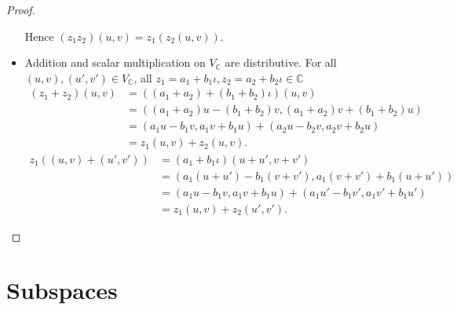 \begin{proof}
\begin{itemize}
              Hence $(z_{1}z_{2})(u, v) = z_{1}(z_{2}(u, v))$.
        \item Addition and scalar multiplication on $V_{\mathbb{C}}$ are distributive. For all $(u, v), (u', v')\in V_{\mathbb{C}}$, all $z_{1} = a_{1} + b_{1}\iota, z_{2} = a_{2} + b_{2}\iota\in \mathbb{C}$
              \begin{align*}
                  (z_{1} + z_{2})(u, v) & = ((a_{1} + a_{2}) + (b_{1} + b_{2})\iota)(u, v)                             \\
                                        & = ((a_{1} + a_{2})u - (b_{1} + b_{2})v, (a_{1} + a_{2})v + (b_{1} + b_{2})u) \\
                                        & = (a_{1}u - b_{1}v, a_{1}v + b_{1}u) + (a_{2}u - b_{2}v, a_{2}v + b_{2}u)    \\
                                        & = z_{1}(u, v) + z_{2}(u, v).
              \end{align*}
              \begin{align*}
                  z_{1}((u, v) + (u', v')) & = (a_{1} + b_{1}\iota)(u + u', v + v')                                        \\
                                           & = (a_{1}(u + u') - b_{1}(v + v'), a_{1}(v + v') + b_{1}(u + u'))              \\
                                           & = (a_{1}u - b_{1}v, a_{1}v + b_{1}u) + (a_{1}u' - b_{1}v', a_{1}v' + b_{1}u') \\
                                           & = z_{1}(u, v) + z_{2}(u', v').
              \end{align*}
    \end{itemize}
\end{proof}

\section{Subspaces}
